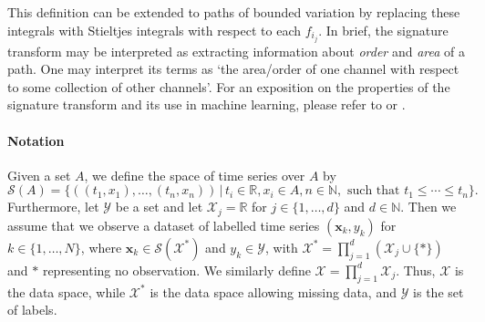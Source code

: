 \documentclass{article}
\renewcommand{\subsubsection}[1]{\textbf{#1}

} %
\newcommand{\reals}{\mathbb{R}}
\newcommand{\naturals}{\mathbb{N}}
\newcommand{\dataspace}{\mathcal{X}}
\newcommand{\lspace}{\mathcal{Y}}
\newcommand{\seriesspace}{\mathcal{S}}
\begin{document}
This definition can be extended to paths of bounded variation by
replacing these integrals with Stieltjes integrals with respect to each
$f_{i_j}$.
%
In brief, the signature transform may be interpreted as extracting
information about \emph{order} and \emph{area} of a path.
%
One may interpret its terms as `the area/order of one channel with
respect to some collection of other channels'.
For an exposition on the properties of the signature transform and its
use in machine learning, please refer to \citet{primer2016} or \citet[Appendix A]{kidger2019deep}.

\paragraph{Notation}
%
Given a set $A$, we define the space of time series over $A$ by
%
\begin{equation}
    \seriesspace(A) = \{((t_1, x_1), \ldots, (t_n, x_n)) \,\vert\, t_i \in \reals, x_i \in A, n \in \naturals, \text{ such that } t_1 \leq \cdots \leq t_n\}.\label{eq:seriesspace}
\end{equation}
%
Furthermore, let $\lspace$ be a set and let $\dataspace_j = \reals$ for $j \in \{1,
\ldots, d\}$ and $d \in \naturals$. Then we assume that we observe
a dataset of labelled time series $(\mathbf{x}_k, y_k)$ for $k \in \{1,
\ldots, N\}$, where $\mathbf{x}_k \in \seriesspace(\dataspace^*)$ and
$y_k \in \lspace$, with $\dataspace^* = \prod_{j = 1}^d(\dataspace_j
\cup \{*\})$ and $*$ representing no observation.
%
We similarly define $\dataspace = \prod_{j = 1}^d\dataspace_j$. Thus,
$\dataspace$ is the data space, while $\dataspace^*$ is the data space
allowing missing data, and $\lspace$ is the set of labels.

\end{document}
